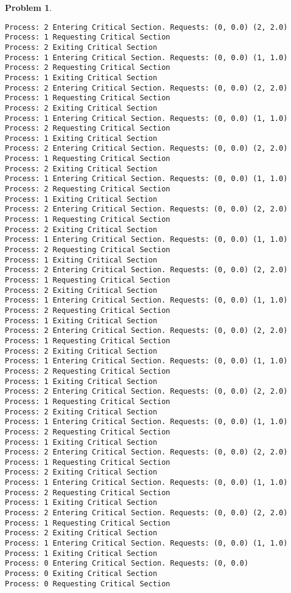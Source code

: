 \documentclass{article}
\theoremstyle{problemstyle}
\newtheorem{problem}{Problem}
\begin{document}
\begin{problem}
\begin{enumerate}[label=(\alph*)]
\begin{lstlisting}
Process: 2 Entering Critical Section. Requests: (0, 0.0) (2, 2.0)
Process: 1 Requesting Critical Section
Process: 2 Exiting Critical Section
Process: 1 Entering Critical Section. Requests: (0, 0.0) (1, 1.0)
Process: 2 Requesting Critical Section
Process: 1 Exiting Critical Section
Process: 2 Entering Critical Section. Requests: (0, 0.0) (2, 2.0)
Process: 1 Requesting Critical Section
Process: 2 Exiting Critical Section
Process: 1 Entering Critical Section. Requests: (0, 0.0) (1, 1.0)
Process: 2 Requesting Critical Section
Process: 1 Exiting Critical Section
Process: 2 Entering Critical Section. Requests: (0, 0.0) (2, 2.0)
Process: 1 Requesting Critical Section
Process: 2 Exiting Critical Section
Process: 1 Entering Critical Section. Requests: (0, 0.0) (1, 1.0)
Process: 2 Requesting Critical Section
Process: 1 Exiting Critical Section
Process: 2 Entering Critical Section. Requests: (0, 0.0) (2, 2.0)
Process: 1 Requesting Critical Section
Process: 2 Exiting Critical Section
Process: 1 Entering Critical Section. Requests: (0, 0.0) (1, 1.0)
Process: 2 Requesting Critical Section
Process: 1 Exiting Critical Section
Process: 2 Entering Critical Section. Requests: (0, 0.0) (2, 2.0)
Process: 1 Requesting Critical Section
Process: 2 Exiting Critical Section
Process: 1 Entering Critical Section. Requests: (0, 0.0) (1, 1.0)
Process: 2 Requesting Critical Section
Process: 1 Exiting Critical Section
Process: 2 Entering Critical Section. Requests: (0, 0.0) (2, 2.0)
Process: 1 Requesting Critical Section
Process: 2 Exiting Critical Section
Process: 1 Entering Critical Section. Requests: (0, 0.0) (1, 1.0)
Process: 2 Requesting Critical Section
Process: 1 Exiting Critical Section
Process: 2 Entering Critical Section. Requests: (0, 0.0) (2, 2.0)
Process: 1 Requesting Critical Section
Process: 2 Exiting Critical Section
Process: 1 Entering Critical Section. Requests: (0, 0.0) (1, 1.0)
Process: 2 Requesting Critical Section
Process: 1 Exiting Critical Section
Process: 2 Entering Critical Section. Requests: (0, 0.0) (2, 2.0)
Process: 1 Requesting Critical Section
Process: 2 Exiting Critical Section
Process: 1 Entering Critical Section. Requests: (0, 0.0) (1, 1.0)
Process: 2 Requesting Critical Section
Process: 1 Exiting Critical Section
Process: 2 Entering Critical Section. Requests: (0, 0.0) (2, 2.0)
Process: 1 Requesting Critical Section
Process: 2 Exiting Critical Section
Process: 1 Entering Critical Section. Requests: (0, 0.0) (1, 1.0)
Process: 1 Exiting Critical Section
Process: 0 Entering Critical Section. Requests: (0, 0.0)
Process: 0 Exiting Critical Section
Process: 0 Requesting Critical Section

\end{lstlisting}
\end{enumerate}
\end{problem}
\end{document}
